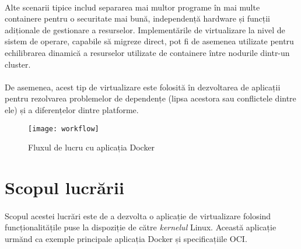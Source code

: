     \paragraph{} Alte scenarii tipice includ separarea mai multor programe în mai multe containere pentru o securitate mai bună, independență hardware și funcții adiționale de gestionare a resurselor. Implementările de virtualizare la nivel de sistem de operare, capabile să migreze direct, pot fi de asemenea utilizate pentru echilibrarea dinamică a resurselor utilizate de containere între nodurile dintr-un cluster. \cite{wiki:osv}
    \paragraph{} De asemenea, acest tip de virtualizare este folosită în dezvoltarea de aplicații pentru rezolvarea problemelor de dependențe (lipsa acestora sau conflictele dintre ele) și a diferențelor dintre platforme. \cite{merkel2014docker}
        \begin{figure}[h!]
            \centering
            \texttt{[image: workflow]}
            \caption{Fluxul de lucru cu aplicația Docker \cite{merkel2014docker}}
            \label{fig:workflow}
        \end{figure}

\section{Scopul lucrării}
    \paragraph{} Scopul acestei lucrări este de a dezvolta o aplicație de virtualizare folosind funcțio\-nalitățile puse la dispoziție de către \textit{kernelul} Linux. Această aplicație urmănd ca exemple principale aplicația Docker și specificațiile OCI.

